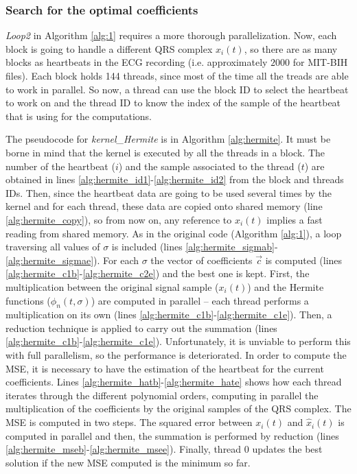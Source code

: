 \documentclass[runningheads]{llncs}
\begin{document}
\subsubsection{Search for the optimal coefficients\\}
\textit{Loop2} in Algorithm \ref{alg:1}  requires a more thorough parallelization.  Now, each block is going to handle a different QRS complex $x_i(t)$, so there are as many blocks as heartbeats in the ECG recording (i.e. approximately $2000$ for MIT-BIH files). Each block holds 144 threads, since most of the time all the treads  are able to work in parallel. So now, a thread can use the block ID to select the heartbeat to work on and the thread ID to know the index of the sample of the heartbeat that is using for the computations. 

The pseudocode for \textit{kernel\_Hermite} is in Algorithm \ref{alg:hermite}. It must be borne in mind that the kernel is executed by all the threads in a block. The number of the heartbeat ($i$) and the sample associated to the thread ($t$) are obtained in lines \ref{alg:hermite_id1}-\ref{alg:hermite_id2} from the block and threads IDs. Then, since the heartbeat data are going to be used several times by the kernel and for each thread, these data are copied onto shared memory (line \ref{alg:hermite_copy}), so from now on, any reference to $x_i(t)$  implies a fast reading from shared memory. As in the original code (Algorithm \ref{alg:1}), a loop traversing all values of $\sigma$ is included (lines \ref{alg:hermite_sigmab}-\ref{alg:hermite_sigmae}). For each $\sigma$ the vector of coefficients $\vec{c}$ is computed (lines \ref{alg:hermite_c1b}-\ref{alg:hermite_c2e}) and the best one is kept. First, the multiplication between the original signal sample ($x_i(t)$) and the Hermite functions ($\phi_n(t,\sigma)$) are computed in parallel -- each thread performs a multiplication on its own (lines \ref{alg:hermite_c1b}-\ref{alg:hermite_c1e}). Then, a reduction technique is applied to carry out the summation \cite{b:kirk10} (lines \ref{alg:hermite_c1b}-\ref{alg:hermite_c1e}). Unfortunately, it is unviable to perform this with full parallelism, so the performance is deteriorated. In order to compute the MSE, it is necessary to have the estimation of the heartbeat for the current coefficients. Lines \ref{alg:hermite_hatb}-\ref{alg:hermite_hate} shows how each thread iterates through the different polynomial orders, computing in parallel the multiplication of the coefficients by the original samples of the QRS complex. The MSE is computed in two steps. The squared error between $x_i(t)$ and $\hat{x}_i(t)$ is computed in parallel and then, the summation is performed by reduction (lines \ref{alg:hermite_mseb}-\ref{alg:hermite_msee}). Finally, thread $0$ updates the best solution if the new MSE computed is the minimum so far.
\end{document}
